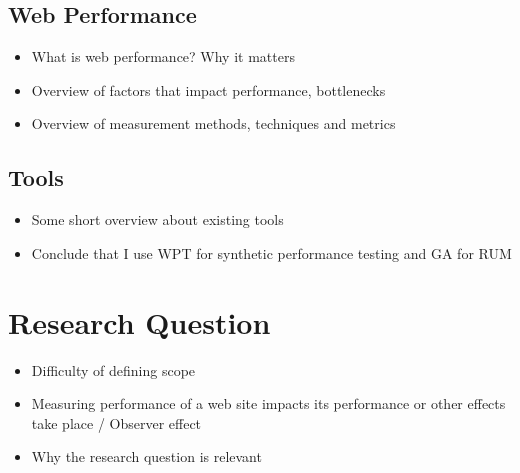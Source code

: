 






\subsection{Web Performance}

\begin{itemize}
\item What is web performance? Why it matters
\item Overview of factors that impact performance, bottlenecks
\item Overview of measurement methods, techniques and metrics
\end{itemize}







\subsection{Tools}


\begin{itemize}
\item Some short overview about existing tools
\item Conclude that I use WPT for synthetic performance testing and GA for RUM
\end{itemize}




\section{Research Question}

\begin{itemize}
\item Difficulty of defining scope
\item Measuring performance of a web site impacts its performance or other effects take place / Observer effect
\item Why the research question is relevant
\end{itemize}


